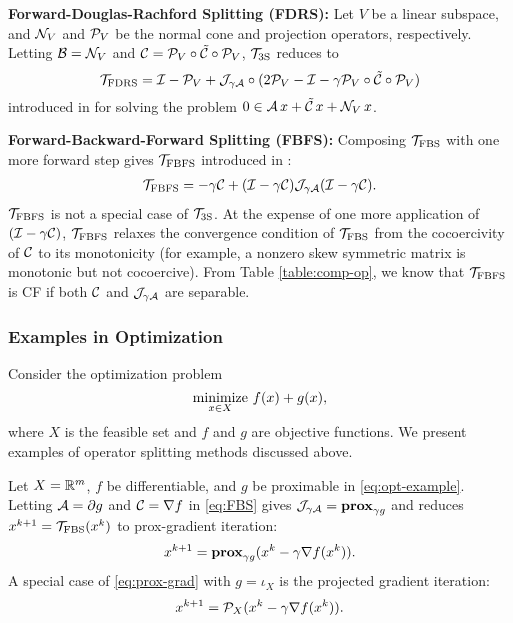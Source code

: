 {\textbf{Forward-Douglas-Rachford Splitting (FDRS):} Let $V$ be  a linear subspace, and ${\mathcal{N}}_V$ and ${\mathcal{P}}_V$ be the normal cone and projection operators, respectively. Letting ${\mathcal{B}}={\mathcal{N}}_V$ and ${\mathcal{C}}={\mathcal{P}}_V\circ\tilde{{\mathcal{C}}}\circ{\mathcal{P}}_V$, ${{\mathcal{T}}_{\mathrm{3S}}}$ reduces to
 $${{\mathcal{T}}_{\mathrm{FDRS}}}={\mathcal{I}}-{\mathcal{P}}_V+{\mathcal{J}}_{\gamma{\mathcal{A}}}\circ(2{\mathcal{P}}_V-{\mathcal{I}}-\gamma {\mathcal{P}}_V\circ\tilde{{\mathcal{C}}}\circ{\mathcal{P}}_V)$$
introduced in \cite{briceno2015FDRS} for solving the problem $0\in{\mathcal{A}}\,x+\tilde{{\mathcal{C}}}\,x+{\mathcal{N}}_V\,x$.

\textbf{Forward-Backward-Forward Splitting (FBFS):} Composing ${{\mathcal{T}}_{\mathrm{FBS}}}$ with one more forward step gives ${{\mathcal{T}}_{\mathrm{FBFS}}}$ introduced in \cite{FBF_Tseng}:
\begin{align}\label{eqn:fbf}
\TFBFS = -\gamma \cC  + (\cI-\gamma \cC)\cJ_{\gamma \cA}(\cI-\gamma \cC).
\end{align} %
${{\mathcal{T}}_{\mathrm{FBFS}}}$ is not  a special case of ${{\mathcal{T}}_{\mathrm{3S}}}$. At the expense of one more application of $({\mathcal{I}}-\gamma {\mathcal{C}})$, ${{\mathcal{T}}_{\mathrm{FBFS}}}$ relaxes the convergence condition  of ${{\mathcal{T}}_{\mathrm{FBS}}}$ from  the cocoercivity of ${\mathcal{C}}$ {to its monotonicity (for example, a nonzero skew symmetric matrix is monotonic but not cocoercive)}. 
From Table \ref{table:comp-op}, we know that ${{\mathcal{T}}_{\mathrm{FBFS}}}$ is CF if both ${\mathcal{C}}$ and ${\mathcal{J}}_{\gamma {\mathcal{A}}}$ are separable.

\subsubsection{Examples in Optimization}
Consider the optimization problem
\begin{equation}\label{eq:opt-example}
\Min_{x\in X}\, f(x)+g(x),
\end{equation}
where $X$ is the feasible set and $f$ and $g$ are objective functions. We present examples of operator splitting methods discussed above.


\begin{example}\label{alg:prox-grad} Let $X=\mathbb{R}^m$, $f$ be differentiable, and $g$ be proximable in \eqref{eq:opt-example}. Letting ${\mathcal{A}}=\partial g$ and ${\mathcal{C}}=\nabla f$ in \eqref{eq:FBS} gives ${\mathcal{J}}_{\gamma {\mathcal{A}}}=\mathbf{prox}_{\gamma g}$ and reduces $x^{k+1}={{\mathcal{T}}_{\mathrm{FBS}}}(x^k)$ to prox-gradient iteration: 
\begin{equation}\label{eq:prox-grad}x^{k+1}=\prox_{\gamma g}(x^k-\gamma\nabla f(x^k)).
\end{equation} 
A special case of \eqref{eq:prox-grad} with $g=\iota_X$ is the projected gradient iteration:
\begin{equation}\label{eq:proj-grad}
x^{k+1}=\cP_X(x^k-\gamma \nabla f(x^k)).
\end{equation}


\end{example}}
